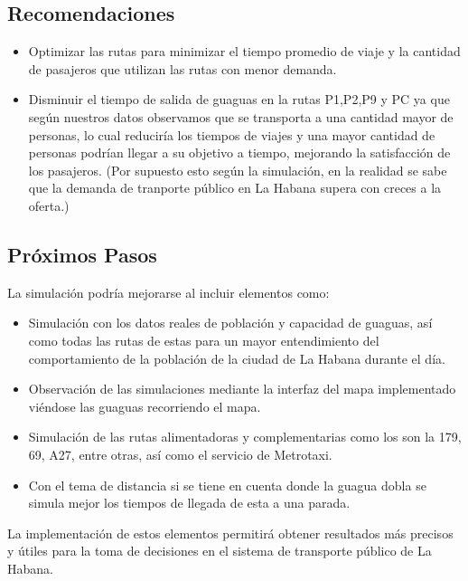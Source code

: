 \documentclass[a4paper,12pt]{article}
\begin{document}
\subsection{Recomendaciones}

\begin{itemize}
\item Optimizar las rutas para minimizar el tiempo promedio de viaje y la cantidad de pasajeros que utilizan las rutas con menor demanda.
\item Disminuir el tiempo de salida de guaguas en la rutas P1,P2,P9 y PC ya que según nuestros datos observamos que  se transporta a una cantidad mayor de personas, lo cual reduciría los tiempos de viajes y una mayor cantidad de personas podrían llegar a su objetivo a tiempo, mejorando la satisfacción de los pasajeros. (Por supuesto esto seg\'un la simulaci\'on, en la realidad se sabe que la demanda de tranporte p\'ublico en La Habana supera con creces a la oferta.)
\end{itemize}

\subsection{Próximos Pasos}

La simulación podría mejorarse al incluir elementos como:

\begin{itemize}
\item Simulación con los datos reales de población y capacidad de guaguas, así como todas las rutas de estas para un mayor entendimiento del comportamiento de la población de la ciudad de La Habana durante el día.
\item Observaci\'on de las simulaciones mediante la interfaz del mapa implementado vi\'endose las guaguas recorriendo el mapa.
\item Simulaci\'on de las rutas alimentadoras y complementarias como los son la 179, 69, A27, entre otras, as\'i como el servicio de Metrotaxi.
\item Con el tema de distancia si se tiene en cuenta donde la guagua dobla se simula mejor los tiempos de llegada de esta a una parada.
\end{itemize}

La implementación de estos elementos permitirá obtener resultados más precisos y útiles para la toma de decisiones en el sistema de transporte público de La Habana.


\end{document}
